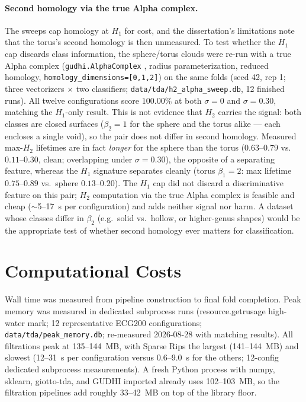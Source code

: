 \documentclass[12pt, a4paper]{report}
\theoremstyle{definition}
\theoremstyle{plain}
\theoremstyle{remark}
\begin{document}
\paragraph{Second homology via the true Alpha complex.}
The sweeps cap homology at $H_1$ for cost, and the dissertation's
limitations note that the torus's second homology is then unmeasured.
To test whether the $H_1$ cap discards class information, the
sphere/torus clouds were re-run with a true Alpha complex
(\texttt{gudhi.AlphaComplex} \cite{maria2014}, radius parameterization, reduced
homology, \texttt{homology\_dimensions=[0,1,2]}) on the same folds
(seed 42, rep 1; three vectorizers $\times$ two classifiers;
\texttt{data/tda/h2\_alpha\_sweep.db}, 12 finished runs). All twelve
configurations score $100.00\%$ at both $\sigma{=}0$ and
$\sigma{=}0.30$, matching the $H_1$-only result. This is not evidence
that $H_2$ carries the signal: both classes are closed surfaces
($\beta_2{=}1$ for the sphere and the torus alike --- each encloses a
single void), so the pair does not differ in second homology. Measured
max-$H_2$ lifetimes are in fact \emph{longer} for the sphere than the
torus ($0.63$--$0.79$ vs.\ $0.11$--$0.30$, clean; overlapping under
$\sigma{=}0.30$), the opposite of a separating feature, whereas the
$H_1$ signature separates cleanly (torus $\beta_1{=}2$: max lifetime
$0.75$--$0.89$ vs.\ sphere $0.13$--$0.20$). The $H_1$ cap did
not discard a discriminative feature on this pair; $H_2$ computation
via the true Alpha complex is feasible and cheap ($\sim$5--17~s per
configuration) and adds neither signal nor harm. A dataset whose
classes differ in $\beta_2$ (e.g.\ solid vs.\ hollow, or higher-genus
shapes) would be the appropriate test of whether second homology ever
matters for classification.

\section{Computational Costs}
\label{sec:pareto}

Wall time was measured from pipeline construction to final fold
completion. Peak memory was measured in dedicated subprocess runs
(resource.getrusage high-water mark; 12 representative ECG200
configurations; \texttt{data/tda/peak\_memory.db}; re-measured
2026-08-28 with matching results). All filtrations peak at
135--144~MB, with Sparse Rips the largest (141--144~MB) and slowest
(12--31~s per configuration versus 0.6--9.0~s for the others; 12-config dedicated subprocess
measurements). A fresh Python process with numpy, sklearn, giotto-tda, and GUDHI imported already uses
102--103~MB, so the filtration pipelines add roughly 33--42~MB on top
of the library floor.
\end{document}

